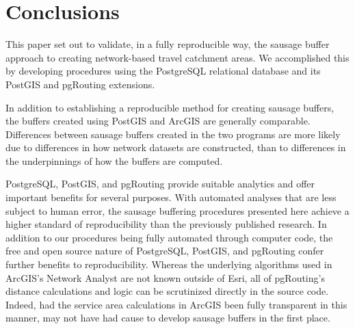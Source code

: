 \documentclass[11pt,letterpaper]{article} %
\begin{document}
\section*{Conclusions}
This paper set out to validate, in a fully reproducible way, the
sausage buffer approach to creating network-based travel catchment
areas. We accomplished this by developing procedures using the
PostgreSQL relational database and its PostGIS and pgRouting
extensions. 

In addition to establishing a reproducible method for creating sausage
buffers, the buffers created using PostGIS and ArcGIS 
are generally comparable. Differences between sausage buffers created in the two
programs are more likely due to differences in how network
datasets are constructed, than to differences in the underpinnings of how the buffers are
computed.

PostgreSQL, PostGIS, and pgRouting provide
suitable analytics and offer important benefits for several purposes.
With automated analyses that are less subject to human error, the sausage buffering procedures presented here achieve a higher
standard of reproducibility than the previously published research. In addition
to our procedures being fully automated through computer code, the
free and open source nature of PostgreSQL, PostGIS, and pgRouting
confer further benefits to reproducibility. Whereas the underlying algorithms used in ArcGIS's Network Analyst are not known outside of Esri,
all of pgRouting's distance calculations and logic can be scrutinized
directly in the source code. Indeed, had the service area calculations in ArcGIS been
fully transparent in this manner, \citeauthor{Forsyth2014sausage} may
not have had cause to develop sausage buffers in the first place.



\printbibliography
\end{document}
